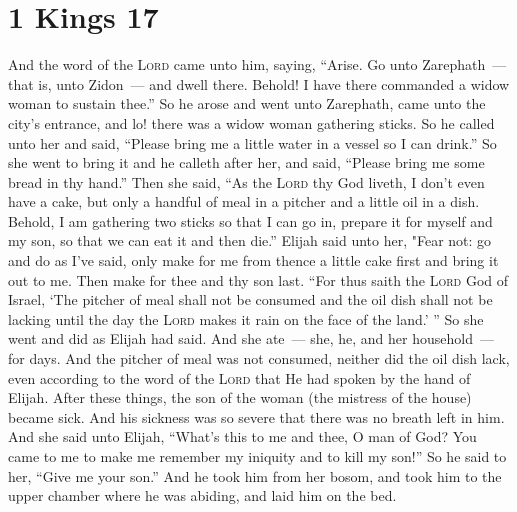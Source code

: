 \section{1 Kings 17}\label{1 Kings 17}
\begin{enumerate}
     And the word of the \textsc{Lord} came unto him, saying,%
     ``Arise. Go unto Zarephath~--- that is, unto Zidon~--- and dwell there. Behold! I have there commanded a widow woman to sustain thee.''%
     So he arose and went unto Zarephath, came unto the city's entrance, and lo! there was a widow woman gathering sticks. So he called unto her and said, ``Please bring me a little water in a vessel so I can drink.''%
     So she went to bring it and he calleth after her, and said, ``Please bring me some bread in thy hand.''%
     Then she said, ``As the \textsc{Lord} thy God liveth, I don't even have a cake, but only a handful of meal in a pitcher and a little oil in a dish. Behold, I am gathering two sticks so that I can go in, prepare it for myself and my son, so that we can eat it and then die.''%
     Elijah said unto her, "Fear not: go and do as I've said, only make for me from thence a little cake first and bring it out to me. Then make for thee and thy son last.%
     ``For thus saith the \textsc{Lord} God of Israel, `The pitcher of meal shall not be consumed and the oil dish shall not be lacking until the day the \textsc{Lord} makes it rain on the face of the land.' ''%
     So she went and did as Elijah had said. And she ate~--- she, he, and her household~--- for days.%
     And the pitcher of meal was not consumed, neither did the oil dish lack, even according to the word of the \textsc{Lord} that He had spoken by the hand of Elijah.%
     After these things, the son of the woman (the mistress of the house) became sick. And his sickness was so severe that there was no breath left in him.%
     And she said unto Elijah, ``What's this to me and thee, O man of God? You came to me to make me remember my iniquity and to kill my son!''%
     So he said to her, ``Give me your son.'' And he took him from her bosom, and took him to the upper chamber where he was abiding, and laid him on the bed.%

\end{enumerate}
